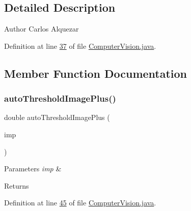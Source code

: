 \subsection{Detailed Description}
\begin{DoxyAuthor}{Author}
Carlos Alquezar 
\end{DoxyAuthor}


Definition at line \hyperlink{_computer_vision_8java_source_l00037}{37} of file \hyperlink{_computer_vision_8java_source}{Computer\+Vision.\+java}.



\subsection{Member Function Documentation}
\hypertarget{classfunctions_1_1_computer_vision_a93e3c71f7e9e359a377ebed559810c28}{}\label{classfunctions_1_1_computer_vision_a93e3c71f7e9e359a377ebed559810c28} 
\subsubsection{\texorpdfstring{auto\+Threshold\+Image\+Plus()}{autoThresholdImagePlus()}\hspace{0.1cm}{\footnotesize\ttfamily [1/2]}}
{\footnotesize\ttfamily double auto\+Threshold\+Image\+Plus (\begin{DoxyParamCaption}\item[{Image\+Plus}]{imp }\end{DoxyParamCaption})}


\begin{DoxyParams}{Parameters}
{\em imp} & \\
\hline
\end{DoxyParams}
\begin{DoxyReturn}{Returns}

\end{DoxyReturn}


Definition at line \hyperlink{_computer_vision_8java_source_l00045}{45} of file \hyperlink{_computer_vision_8java_source}{Computer\+Vision.\+java}.

\hypertarget{classfunctions_1_1_computer_vision_a682b3978d10477ebaf0c32969ff6650b}{}\label{classfunctions_1_1_computer_vision_a682b3978d10477ebaf0c32969ff6650b} 
